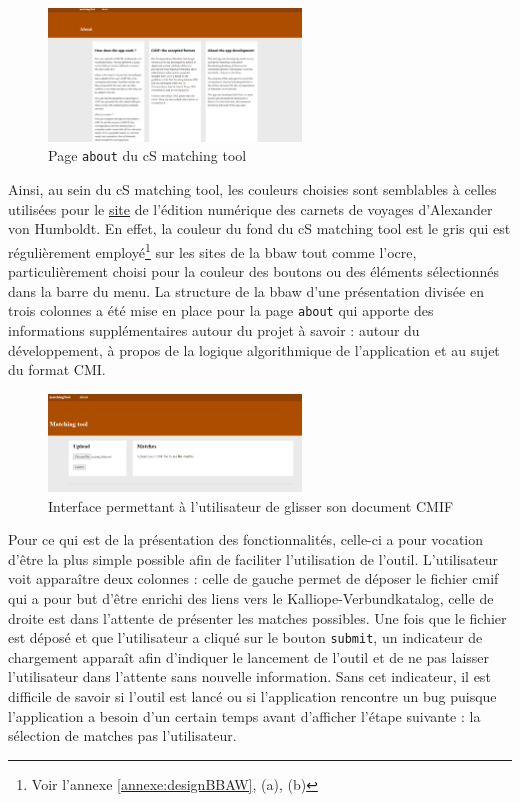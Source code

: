 \documentclass[a4paper, 12pt, twoside]{book}
\begin{document}
\begin{figure}
\centering
\includegraphics[width=0.6\textwidth]{img/csMT_about.png}
\caption{Page \texttt{about} du cS matching tool}
\vspace{-10pt}
\end{figure}
Ainsi, au sein du cS matching tool, les couleurs choisies sont semblables à celles utilisées pour le \href{https://edition-humboldt.de/index.xql?l=en}{site} de l'édition numérique des carnets de voyages d'Alexander von Humboldt. En effet, la couleur du fond du cS matching tool est le gris qui est régulièrement employé\footnote{Voir l'annexe \ref{annexe:designBBAW}, (a), (b)} sur les sites de la \gls{bbaw} tout comme l'ocre, particulièrement choisi pour la couleur des boutons ou des éléments sélectionnés dans la barre du menu. La structure de la \gls{bbaw} d'une présentation divisée en trois colonnes a été mise en place pour la page \texttt{about} qui apporte des informations supplémentaires autour du projet à savoir : autour du développement, à propos de la logique algorithmique de l'application et au sujet du format CMI.

\begin{figure}
\centering
\includegraphics[width=0.6\textwidth]{img/csMT_page1.png}
\caption{Interface permettant à l'utilisateur de glisser son document CMIF}
\vspace{-10pt}
\end{figure}

Pour ce qui est de la présentation des fonctionnalités, celle-ci a pour vocation d'être la plus simple possible afin de faciliter l'utilisation de l'outil. L'utilisateur voit apparaître deux colonnes : celle de gauche permet de déposer le fichier \gls{cmif} qui a pour but d'être enrichi des liens vers le Kalliope-Verbundkatalog, celle de droite est dans l'attente de présenter les matches possibles. Une fois que le fichier est déposé et que l'utilisateur a cliqué sur le bouton \texttt{submit}, un indicateur de chargement apparaît afin d'indiquer le lancement de l'outil et de ne pas laisser l'utilisateur dans l'attente sans nouvelle information. Sans cet indicateur, il est difficile de savoir si l'outil est lancé ou si l'application rencontre un bug puisque l'application a besoin d'un certain temps avant d'afficher l'étape suivante : la sélection de matches pas l'utilisateur.
\end{document}
